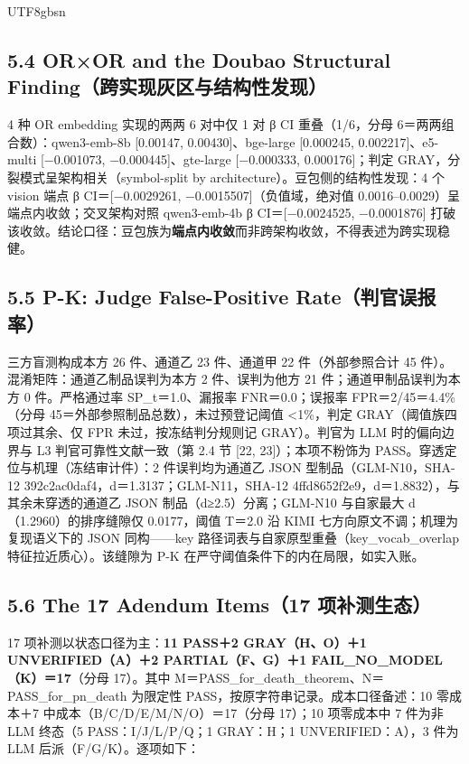 \documentclass[10pt,a4paper]{article}
\begin{document}
\begin{CJK}{UTF8}{gbsn}
\subsection*{5.4 OR×OR and the Doubao Structural Finding（跨实现灰区与结构性发现）}4 种 OR embedding 实现的两两 6 对中仅 1 对 β CI 重叠（1/6，分母 6＝两两组合数）：qwen3-emb-8b [0.00147, 0.00430]、bge-large [0.000245, 0.002217]、e5-multi [−0.001073, −0.000445]、gte-large [−0.000333, 0.000176]；判定 GRAY，分裂模式呈架构相关（symbol-split by architecture）。豆包侧的结构性发现：4 个 vision 端点 β CI＝[−0.0029261, −0.0015507]（负值域，绝对值 0.0016–0.0029）呈端点内收敛；交叉架构对照 qwen3-emb-4b β CI＝[−0.0024525, −0.0001876] 打破该收敛。结论口径：豆包族为\textbf{端点内收敛}而非跨架构收敛，不得表述为跨实现稳健。

\subsection*{5.5 P-K: Judge False-Positive Rate（判官误报率）}三方盲测构成本方 26 件、通道乙 23 件、通道甲 22 件（外部参照合计 45 件）。混淆矩阵：通道乙制品误判为本方 2 件、误判为他方 21 件；通道甲制品误判为本方 0 件。严格通过率 SP\_t＝1.0、漏报率 FNR＝0.0；误报率 FPR＝2/45＝4.4\%（分母 45＝外部参照制品总数），未过预登记阈值 <1\%，判定 GRAY（阈值族四项过其余、仅 FPR 未过，按冻结判分规则记 GRAY）。判官为 LLM 时的偏向边界与 L3 判官可靠性文献一致（第 2.4 节 [22, 23]）；本项不粉饰为 PASS。穿透定位与机理（冻结审计件）：2 件误判均为通道乙 JSON 型制品（GLM-N10，SHA-12 392c2ac0daf4，d＝1.3137；GLM-N11，SHA-12 4ffd8652f2e9，d＝1.8832），与其余未穿透的通道乙 JSON 制品（d≥2.5）分离；GLM-N10 与自家最大 d（1.2960）的排序缝隙仅 0.0177，阈值 T＝2.0 沿 KIMI 七方向原文不调；机理为复现语义下的 JSON 同构——key 路径词表与自家原型重叠（key\_vocab\_overlap 特征拉近质心）。该缝隙为 P-K 在严守阈值条件下的内在局限，如实入账。

\subsection*{5.6 The 17 Adendum Items（17 项补测生态）}17 项补测以状态口径为主：\textbf{11 PASS＋2 GRAY（H、O）＋1 UNVERIFIED（A）＋2 PARTIAL（F、G）＋1 FAIL\_NO\_MODEL（K）＝17}（分母 17）。其中 M＝PASS\_for\_death\_theorem、N＝PASS\_for\_pn\_death 为限定性 PASS，按原字符串记录。成本口径备述：10 零成本＋7 中成本（B/C/D/E/M/N/O）＝17（分母 17）；10 项零成本中 7 件为非 LLM 终态（5 PASS：I/J/L/P/Q；1 GRAY：H；1 UNVERIFIED：A），3 件为 LLM 后派（F/G/K）。逐项如下：



\end{CJK}
\end{document}
